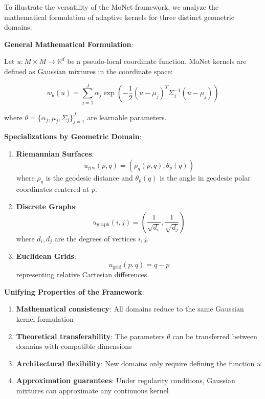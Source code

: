 \begin{example}

To illustrate the versatility of the MoNet framework, we analyze the mathematical formulation of adaptive kernels for three distinct geometric domains:

\textbf{General Mathematical Formulation}:

Let $u: M \times M \to \mathbb{R}^d$ be a pseudo-local coordinate function. MoNet kernels are defined as Gaussian mixtures in the coordinate space:

\begin{equation}
w_\theta(u) = \sum_{j=1}^J \alpha_j \exp\left(-\frac{1}{2}(u - \mu_j)^T \Sigma_j^{-1} (u - \mu_j)\right)
\end{equation}

where $\theta = \{\alpha_j, \mu_j, \Sigma_j\}_{j=1}^J$ are learnable parameters.

\textbf{Specializations by Geometric Domain}:

\begin{enumerate}
    \item \textbf{Riemannian Surfaces}:
    \begin{equation}
    u_{\text{geo}}(p,q) = (\rho_g(p,q), \theta_p(q))
    \end{equation}
    where $\rho_g$ is the geodesic distance and $\theta_p(q)$ is the angle in geodesic polar coordinates centered at $p$.

    \item \textbf{Discrete Graphs}:
    \begin{equation}
    u_{\text{graph}}(i,j) = \left(\frac{1}{\sqrt{d_i}}, \frac{1}{\sqrt{d_j}}\right)
    \end{equation}
    where $d_i, d_j$ are the degrees of vertices $i, j$.

    \item \textbf{Euclidean Grids}:
    \begin{equation}
    u_{\text{grid}}(p,q) = q - p
    \end{equation}
    representing relative Cartesian differences.
\end{enumerate}

\textbf{Unifying Properties of the Framework}:
\begin{enumerate}
    \item \textbf{Mathematical consistency}: All domains reduce to the same Gaussian kernel formulation
    \item \textbf{Theoretical transferability}: The parameters $\theta$ can be transferred between domains with compatible dimensions
    \item \textbf{Architectural flexibility}: New domains only require defining the function $u$
    \item \textbf{Approximation guarantees}: Under regularity conditions, Gaussian mixtures can approximate any continuous kernel
\end{enumerate}
\end{example}

